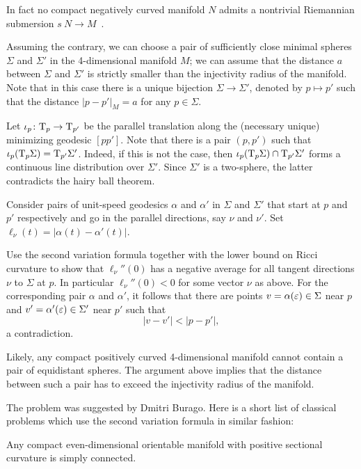 In fact no compact negatively curved manifold $N$ admits a nontrivial Riemannian submersion $s\:N\to M$~\cite[see Theorem F in][]{zeghib}. 





Assuming the contrary,
we can choose a pair of sufficiently close minimal spheres $\Sigma$ and $\Sigma'$ in the 4-dimensional manifold $M$;
we can assume that the distance $a$ between $\Sigma$ and $\Sigma'$ is strictly smaller than the injectivity radius of the manifold.
Note that in this case there is a unique bijection $\Sigma\to \Sigma'$, denoted by $p\mapsto p'$ such that the distance $|p-p'|_M=a$ for any $p\in\Sigma$.

Let $\iota_p\colon\mathrm{T}_p\to\mathrm{T}_{p'}$ be the parallel translation along the (necessary unique) minimizing geodesic $[pp']$.
Note that there is a pair $(p,p')$ such that $\iota_p(\mathrm{T}_p\Sigma)=\mathrm{T}_{p'}\Sigma'$.
Indeed, if this is not the case, then $\iota_p(\T_p\Sigma)\z\cap\T_{p'}\Sigma'$ forms a continuous line distribution over $\Sigma'$.
Since $\Sigma'$ is a two-sphere, the latter contradicts the hairy ball theorem.

Consider pairs of unit-speed geodesics $\alpha$ and $\alpha'$ 
in $\Sigma$ and $\Sigma'$  
that start at $p$ and $p'$ respectively
and go in the parallel directions, say $\nu$ and $\nu'$. %
Set $\ell_\nu(t)=|\alpha(t)-\alpha'(t)|$.

Use the second variation formula together with the lower bound on Ricci curvature
to show that $\ell_\nu''(0)$ has a negative average for all tangent directions $\nu$ to $\Sigma$ at $p$. 
In particular $\ell_\nu''(0)<0$ for some vector $\nu$ as above.
For the corresponding pair $\alpha$ and $\alpha'$,
it follows that there are points $v=\alpha(\varepsilon)\in\Sigma$ near $p$ 
and $v'=\alpha'(\varepsilon)\in\Sigma'$ near $p'$
such that 
\[|v-v'|<|p-p'|,\]
a contradiction.\qeds

Likely, any compact positively curved 
4-dimensional manifold
cannot contain a pair of equidistant spheres.
The argument above implies that the distance between such a pair has to exceed the injectivity radius of the manifold.


The problem was suggested by Dmitri Burago.
Here is a short list of classical problems which use the second variation formula in similar fashion:

\begin{pr}
Any compact even-dimensional orientable manifold with positive sectional curvature is
simply connected.
\end{pr}

